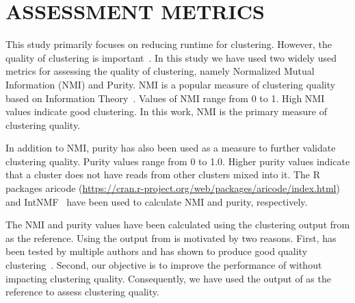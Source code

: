 \section{ASSESSMENT METRICS}\label{sec:metrics}

This study primarily focuses on reducing runtime for clustering.
However, the quality of clustering is important~\cite{hazelhurst-11}.
In this study we have used two widely used metrics for assessing the
quality of clustering, namely Normalized Mutual Information (NMI) and
Purity.  NMI is a popular measure of clustering quality based on
Information Theory~\cite{strehl-03}. Values of NMI range from 0 to
1. High NMI values indicate good clustering.  In this work, NMI is the
primary measure of clustering quality.

In addition to NMI, purity has also been used as a measure to further
validate clustering quality. Purity values range from 0 to 1.0.
Higher purity values indicate that a cluster does not have reads from
other clusters mixed into it.  The R packages aricode
(\url{https://cran.r-project.org/web/packages/aricode/index.html}) and
IntNMF~\cite{chalise-17} have been used to calculate NMI and purity,
respectively.

The NMI and purity values have been calculated using the clustering
output from \peace\/ as the reference.  Using the output from \peace\/
is motivated by two reasons.  First, \peace\/ has been tested by
multiple authors and has shown to produce good quality
clustering~\cite{rao-10,hazelhurst-11}.  Second, our objective is to
improve the performance of \peace\/ without impacting clustering
quality.  Consequently, we have used the output of \peace\/ as the
reference to assess clustering quality.

